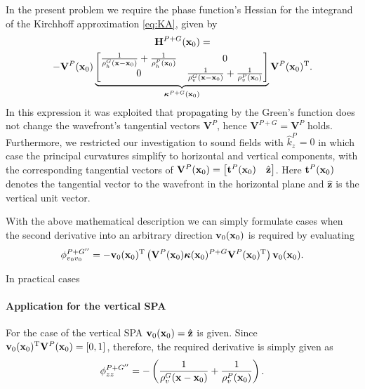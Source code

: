 In the present problem we require the phase function's Hessian for the integrand of the Kirchhoff approximation \eqref{eq:KA}, given by
{\fontsize{8pt}{\baselineskip}
\selectfont
\begin{multline}
  \mathbf{H}^{P+G}(\mathbf{x}_0) = \\
  -\mathbf{V}^P(\mathbf{x}_0)
  \underbrace{\begin{bmatrix} \frac{1}{\rho^G_h(\mathbf{x}-\mathbf{x}_0)} + \frac{1}{\rho^P_h(\mathbf{x}_0)} & 0 \\[.0em] 0 & \frac{1}{\rho^G_v(\mathbf{x}-\mathbf{x}_0)} + \frac{1}{\rho^P_v(\mathbf{x}_0)} \\[0.0em] \end{bmatrix}}_{\boldsymbol{\kappa}^{P+G}(\mathbf{x}_0)}
  \mathbf{V}^P(\mathbf{x}_0)^{\mathrm{T}}.
\end{multline}}
In this expression it was exploited that propagating by the Green's function does not change the wavefront's tangential vectors $\mathbf{V}^P$, hence $\mathbf{V}^{P+G} = \mathbf{V}^P$ holds. 
Furthermore, we restricted our investigation to sound fields with $\hat{k}^P_z = 0$ in which case the principal curvatures simplify to horizontal and vertical components, with the corresponding tangential vectors of $\mathbf{V}^P(\mathbf{x}_0) = \begin{bmatrix} \mathbf{t}^P(\mathbf{x}_0) & \hat{\mathbf{z}} \\\end{bmatrix}$.
Here $\mathbf{t}^P(\mathbf{x}_0)$ denotes the tangential vector to the wavefront in the horizontal plane and $\hat{\mathbf{z}}$ is the vertical unit vector.

With the above mathematical description we can simply formulate cases when the second derivative into an arbitrary direction $\mathbf{v}_0(\mathbf{x}_0)$ is required by evaluating
\begin{multline}
  \phi^{P+G''}_{v_0v_0} =
-  \mathbf{v}_0(\mathbf{x}_0)^{\mathrm{T}}\left( \mathbf{V}^P(\mathbf{x}_0) \boldsymbol{\kappa}(\mathbf{x}_0)^{P+G} \mathbf{V}^P(\mathbf{x}_0)^{\mathrm{T}} \right)\mathbf{v}_0(\mathbf{x}_0).
\end{multline}

In practical cases 

\paragraph{Application for the vertical SPA}
For the case of the vertical SPA $\mathbf{v}_0(\mathbf{x}_0) = \hat{\mathbf{z}}$ is given.
Since $\mathbf{v}_0(\mathbf{x}_0)^{\mathrm{T}} \mathbf{V}^P(\mathbf{x}_0) = [0,1]$, therefore, the required derivative is simply given as
\begin{equation}
  \phi^{P+G''}_{zz} = -\left( \frac{1}{\rho^G_v(\mathbf{x}-\mathbf{x}_0)} + \frac{1}{\rho^P_v(\mathbf{x}_0)}\right).
  \label{eq:curvature_vert}
\end{equation}

